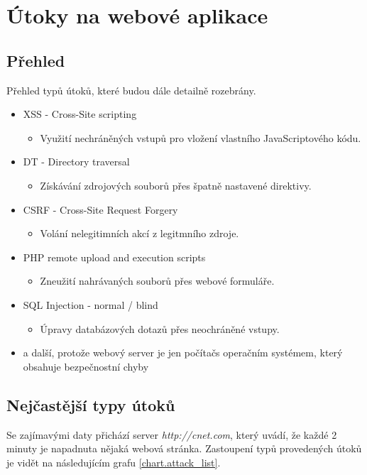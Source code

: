 \documentclass[12pt, a4paper]{report}
\begin{document}
\chapter{Útoky na webové aplikace}
\section{Přehled}
Přehled typů útoků, které budou dále detailně rozebrány.
\begin{itemize}
\item XSS - Cross-Site scripting
\begin{itemize}
\item Využití nechráněných vstupů pro vložení vlastního JavaScriptového kódu.
\end{itemize}
\item DT - Directory traversal
\begin{itemize}
\item Získávání zdrojových souborů přes špatně nastavené direktivy.
\end{itemize}
\item CSRF - Cross-Site Request Forgery 
\begin{itemize}
\item Volání nelegitimních akcí z legitmního zdroje.
\end{itemize}
\item PHP remote upload and execution scripts
\begin{itemize}
\item Zneužití nahrávaných souborů přes webové formuláře.
\end{itemize}
\item SQL Injection - normal / blind
\begin{itemize}
\item Úpravy databázových dotazů přes neochráněné vstupy.
\end{itemize}
\item a další, protože webový server je jen počítačs operačním systémem, který obsahuje bezpečnostní chyby
\end{itemize}

\section{Nejčastější typy útoků}
Se zajímavými daty přichází server \textit{http://cnet.com}, který uvádí, že každé 2 minuty je napadnuta nějaká webová stránka. Zastoupení typů provedených útoků je vidět na následujícím grafu \ref{chart.attack_list}.
\end{document}
